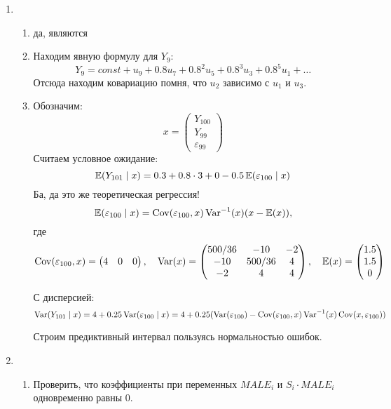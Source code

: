 \begin{enumerate}
    \item \begin{enumerate}
    \item да, являются
    \item Находим явную формулу для $Y_9$:
    \[
    Y_9 = const + u_9 + 0.8 u_7 + 0.8^2 u_5 + 0.8^3 u_3 + 0.8^5 u_1 + \ldots
    \]
    Отсюда находим ковариацию помня, что $u_2$ зависимо с $u_1$ и $u_3$.

    \item Обозначим:
    \[
    x = \begin{pmatrix}
        Y_{100} \\
        Y_{99} \\
        \varepsilon_{99}
    \end{pmatrix}    
    \]
    Считаем условное ожидание:
    \[
    \operatorname{\mathbb{E}}(Y_{101} \mid x) = 0.3 + 0.8 \cdot 3 + 0 -0.5 \operatorname{\mathbb{E}}(\varepsilon_{100} \mid x)    
    \]
    Ба, да это же теоретическая регрессия!
    \[
    \operatorname{\mathbb{E}}(\varepsilon_{100} \mid x) =  \operatorname{Cov}(\varepsilon_{100}, x) \operatorname{Var}^{-1}(x) (x - \operatorname{\mathbb{E}}(x)),
    \]
    где
    \[
        \operatorname{Cov}(\varepsilon_{100}, x) = \begin{pmatrix}
            4 & 0 & 0
        \end{pmatrix}, \quad \operatorname{Var}(x) = \begin{pmatrix}
            500/36 & -10 & -2 \\
            -10 & 500/36 & 4 \\
            -2 & 4 & 4 \\
        \end{pmatrix}, \quad
        \operatorname{\mathbb{E}}(x) = \begin{pmatrix}
            1.5 \\
            1.5 \\
            0 
        \end{pmatrix}
    \]

    С дисперсией:
    \[
    \operatorname{Var}(Y_{101} \mid x) = 4 + 0.25 \operatorname{Var}(\varepsilon_{100} \mid x) = 
    4  + 0.25 (\operatorname{Var}(\varepsilon_{100}) - \operatorname{Cov}(\varepsilon_{100}, x) \operatorname{Var}^{-1}(x) \operatorname{Cov}(x, \varepsilon_{100}))   
    \]


    Строим предиктивный интервал пользуясь нормальностью ошибок.
    \end{enumerate}
    \item \begin{enumerate}
            \item Проверить, что коэффициенты при переменных $MALE_i$ и $S_i\cdot MALE_i$ одновременно равны 0. 


\end{enumerate}
\end{enumerate}
